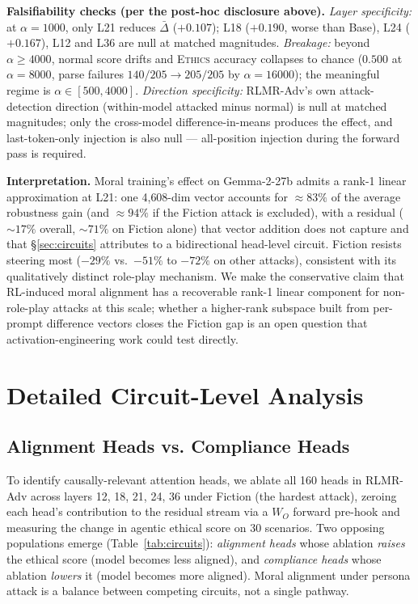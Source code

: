 \documentclass{article}
\newcommand{\rlmr}{\textnormal{RLMR}}
\newcommand{\ethics}{\textup{\textsc{Ethics}}}
\begin{document}
\textbf{Falsifiability checks (per the post-hoc disclosure above).} \emph{Layer specificity:} at $\alpha{=}1000$, only L21 reduces $\bar{\Delta}$ ($+0.107$); L18 ($+0.190$, worse than Base), L24 ($+0.167$), L12 and L36 are null at matched magnitudes. \emph{Breakage:} beyond $\alpha\geq 4000$, normal score drifts and \ethics{} accuracy collapses to chance ($0.500$ at $\alpha{=}8000$, parse failures $140/205\to 205/205$ by $\alpha{=}16000$); the meaningful regime is $\alpha\in[500,4000]$. \emph{Direction specificity:} \rlmr{}-Adv's own attack-detection direction (within-model attacked minus normal) is null at matched magnitudes; only the cross-model difference-in-means produces the effect, and last-token-only injection is also null --- all-position injection during the forward pass is required.

\textbf{Interpretation.} Moral training's effect on Gemma-2-27b admits a rank-1 linear approximation at L21: one 4{,}608-dim vector accounts for $\approx 83\%$ of the average robustness gain (and $\approx 94\%$ if the Fiction attack is excluded), with a residual ($\sim 17\%$ overall, $\sim 71\%$ on Fiction alone) that vector addition does not capture and that \S\ref{sec:circuits} attributes to a bidirectional head-level circuit. Fiction resists steering most ($-29\%$ vs.\ $-51\%$ to $-72\%$ on other attacks), consistent with its qualitatively distinct role-play mechanism. We make the conservative claim that RL-induced moral alignment has a recoverable rank-1 linear component for non-role-play attacks at this scale; whether a higher-rank subspace built from per-prompt difference vectors closes the Fiction gap is an open question that activation-engineering work could test directly.




\section{Detailed Circuit-Level Analysis}
\label{sec:circuit_details_app}

\subsection{Alignment Heads vs. Compliance Heads}

To identify causally-relevant attention heads, we ablate all 160 heads in \rlmr{}-Adv across layers 12, 18, 21, 24, 36 under Fiction (the hardest attack), zeroing each head's contribution to the residual stream via a $W_O$ forward pre-hook and measuring the change in agentic ethical score on 30 scenarios. Two opposing populations emerge (Table~\ref{tab:circuits}): \emph{alignment heads} whose ablation \emph{raises} the ethical score (model becomes less aligned), and \emph{compliance heads} whose ablation \emph{lowers} it (model becomes more aligned). Moral alignment under persona attack is a balance between competing circuits, not a single pathway.
\end{document}
